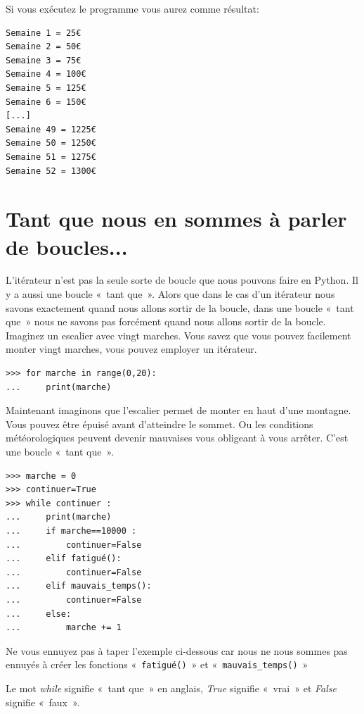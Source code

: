 Si vous exécutez le programme vous aurez comme résultat:

\begin{Verbatim}[frame=single,rulecolor=\color{gray}, label=ne pas saisir]
Semaine 1 = 25€
Semaine 2 = 50€
Semaine 3 = 75€
Semaine 4 = 100€
Semaine 5 = 125€
Semaine 6 = 150€
[...]
Semaine 49 = 1225€
Semaine 50 = 1250€
Semaine 51 = 1275€
Semaine 52 = 1300€
\end{Verbatim}

\section{Tant que nous en sommes à parler de boucles...}

L'itérateur n'est pas la seule sorte de boucle que nous pouvons faire en Python.  Il y a aussi une boucle «~tant que~». Alors que dans le cas d'un itérateur nous savons exactement quand nous allons sortir de la boucle, dans une boucle «~tant que~» nous ne savons pas forcément quand nous allons sortir de la boucle.  Imaginez un escalier avec vingt marches. Vous savez que vous pouvez facilement monter vingt marches, vous pouvez employer un itérateur.

\begin{Verbatim}[frame=single,rulecolor=\color{gray}, label=ne pas saisir]
>>> for marche in range(0,20):
...     print(marche)
\end{Verbatim}

Maintenant imaginons que l'escalier permet de monter en haut d'une montagne. Vous pouvez être épuisé avant d'atteindre le sommet. Ou les conditions météorologiques peuvent devenir mauvaises vous obligeant à vous arrêter.
C'est une boucle «~tant que~».

\begin{Verbatim}[frame=single,rulecolor=\color{gray}, label=ne pas saisir]
>>> marche = 0
>>> continuer=True
>>> while continuer :
...     print(marche)
...     if marche==10000 :
...         continuer=False
...     elif fatigué():
...         continuer=False
...     elif mauvais_temps():
...         continuer=False
...     else:
...         marche += 1
\end{Verbatim}

Ne vous ennuyez pas à taper l'exemple ci-dessous car nous ne nous sommes pas ennuyés à créer les fonctions «~\texttt{fatigué()}~» et «~\texttt{mauvais\_temps()}~» 

Le mot \emph{while} signifie «~tant que~» en anglais, \emph{True} signifie «~vrai~» et \emph{False} signifie «~faux~».

